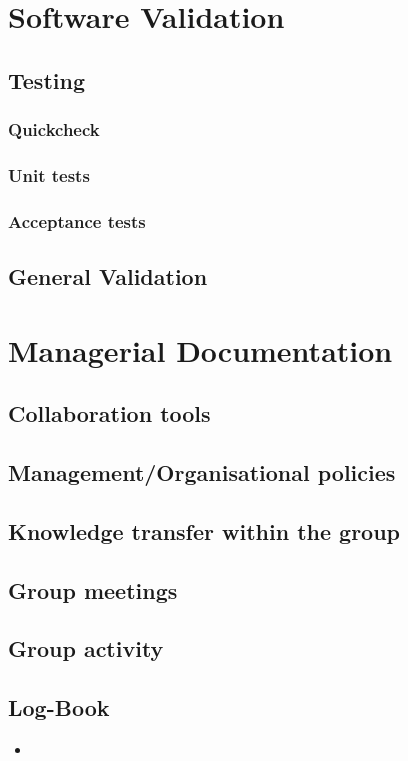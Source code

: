 \documentclass[12pt]{article}
\begin{document}
\section{Software Validation}
 

\subsection{Testing}
\subsubsection{Quickcheck}
\subsubsection{Unit tests}
\subsubsection{Acceptance tests}

\subsection{General Validation}


\section{Managerial Documentation}
\subsection{Collaboration tools}
\subsection{Management/Organisational policies}
\subsection{Knowledge transfer within the group}
\subsection{Group meetings}
\subsection{Group activity}
\subsection{Log-Book}


\begin{itemize}
\item 
\end{itemize}
\end{document}
